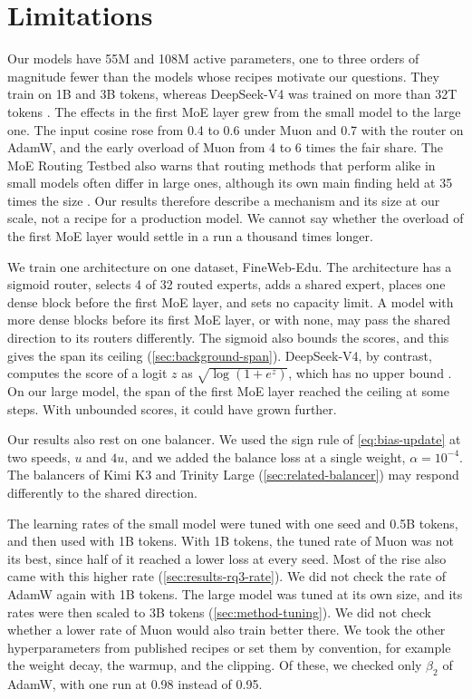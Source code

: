 \section{Limitations}
\label{sec:discussion-limitations}
Our models have 55M and 108M active parameters, one to three orders of magnitude fewer than the models whose recipes motivate our questions. They train on 1B and 3B tokens, whereas DeepSeek-V4 was trained on more than 32T tokens \cite{deepseek2026v4}. The effects in the first MoE layer grew from the small model to the large one. The input cosine rose from 0.4 to 0.6 under Muon and 0.7 with the router on AdamW, and the early overload of Muon from 4 to 6 times the fair share. The MoE Routing Testbed also warns that routing methods that perform alike in small models often differ in large ones, although its own main finding held at 35 times the size \cite{falke2026testbed}. Our results therefore describe a mechanism and its size at our scale, not a recipe for a production model. We cannot say whether the overload of the first MoE layer would settle in a run a thousand times longer.

We train one architecture on one dataset, FineWeb-Edu. The architecture has a sigmoid router, selects 4 of 32 routed experts, adds a shared expert, places one dense block before the first MoE layer, and sets no capacity limit. A model with more dense blocks before its first MoE layer, or with none, may pass the shared direction to its routers differently. The sigmoid also bounds the scores, and this gives the span its ceiling (\cref{sec:background-span}). DeepSeek-V4, by contrast, computes the score of a logit $z$ as $\sqrt{\log(1 + e^{z})}$, which has no upper bound \cite{deepseek2026v4}. On our large model, the span of the first MoE layer reached the ceiling at some steps. With unbounded scores, it could have grown further.

Our results also rest on one balancer. We used the sign rule of \cref{eq:bias-update} at two speeds, $u$ and $4u$, and we added the balance loss at a single weight, $\alpha = 10^{-4}$. The balancers of Kimi K3 and Trinity Large (\cref{sec:related-balancer}) may respond differently to the shared direction.

The learning rates of the small model were tuned with one seed and 0.5B tokens, and then used with 1B tokens. With 1B tokens, the tuned rate of Muon was not its best, since half of it reached a lower loss at every seed. Most of the rise also came with this higher rate (\cref{sec:results-rq3-rate}). We did not check the rate of AdamW again with 1B tokens. The large model was tuned at its own size, and its rates were then scaled to 3B tokens (\cref{sec:method-tuning}). We did not check whether a lower rate of Muon would also train better there. We took the other hyperparameters from published recipes or set them by convention, for example the weight decay, the warmup, and the clipping. Of these, we checked only $\beta_2$ of AdamW, with one run at 0.98 instead of 0.95.

